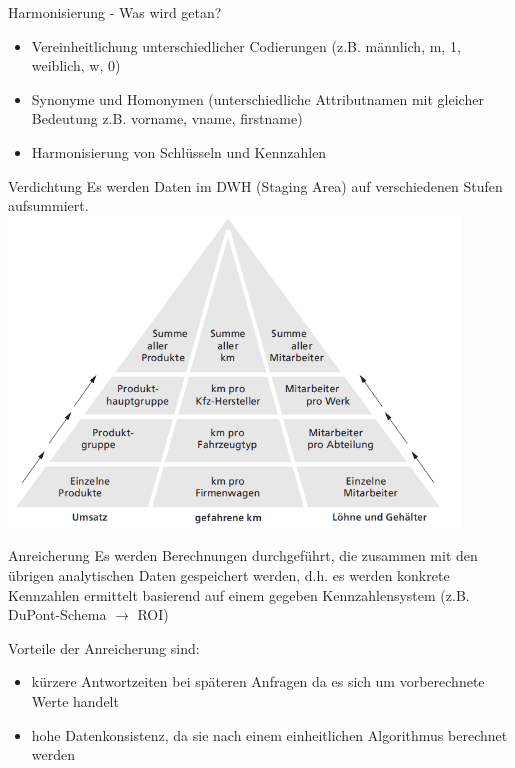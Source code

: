 \documentclass[a6paper,10pt,grid=front%
,toc
]{kartei}
\begin{document}
  \begin{karte}{Harmonisierung - Was wird getan?}
    \begin{itemize}
      \item Vereinheitlichung unterschiedlicher Codierungen (z.B. männlich, m, 1, weiblich, w, 0)
      \item Synonyme und Homonymen (unterschiedliche Attributnamen mit gleicher Bedeutung z.B. vorname, vname, firstname)
      \item Harmonisierung von Schlüsseln und Kennzahlen      
    \end{itemize}
  \end{karte}

  \begin{karte}{Verdichtung}
    Es werden Daten im DWH (Staging Area) auf verschiedenen Stufen aufsummiert.
    \includegraphics[width=0.9\textwidth]{img/verdichtung}
  \end{karte}

  \begin{karte}{Anreicherung}
    Es werden Berechnungen durchgeführt, die zusammen mit den übrigen analytischen Daten gespeichert werden, d.h. es werden konkrete Kennzahlen ermittelt basierend auf einem gegeben Kennzahlensystem (z.B. DuPont-Schema $\rightarrow$ ROI)

    Vorteile der Anreicherung sind:
    \begin{itemize}
      \item kürzere Antwortzeiten bei späteren Anfragen da es sich um vorberechnete Werte handelt
      \item hohe Datenkonsistenz, da sie nach einem einheitlichen Algorithmus berechnet werden
    \end{itemize}
  \end{karte}  
\end{document}

